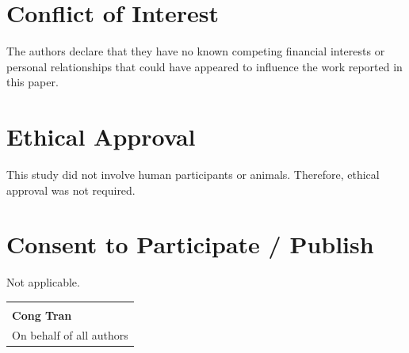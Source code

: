 \documentclass[11pt,a4paper]{article} %
\begin{document}
\section*{Conflict of Interest}
The authors declare that they have no known competing financial interests or personal relationships that could have appeared to influence the work reported in this paper.

\section*{Ethical Approval}
This study did not involve human participants or animals. Therefore, ethical approval was not required.

\section*{Consent to Participate / Publish}
Not applicable.

\vspace{3em}

\noindent
\begin{tabular}{@{}p{2.5in}}
    \hrulefill \\
    \textbf{Cong Tran} \\
    On behalf of all authors
\end{tabular}
\end{document}
